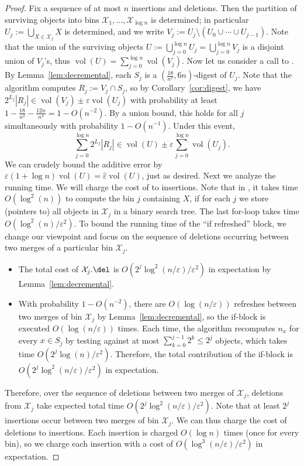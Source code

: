 \documentclass[11pt]{article}
\def\vol{\operatorname{vol}}		%
\newcommand{\eps}{\varepsilon}
\newcommand{\class}[1]{\mathcal{#1}}
\begin{document}
\begin{proof}
    Fix a sequence of at most $n$ insertions and deletions. Then the partition of surviving objects into bins $\class{X}_1, \dots, \class{X}_{\log n}$ is determined; in particular $U_j := \bigcup_{X \in \class{X}_j} X$ is determined, and we write $V_j := U_j \setminus (U_0 \cup \cdots \cup U_{j-1})$. Note that the union of the surviving objects $U := \bigcup_{j=0}^{\log n} U_j = \bigcup_{j=0}^{\log n} V_j$ is a disjoint union of $V_j$'s, thus $\vol(U) = \sum_{j=0}^{\log n} \vol(V_j)$.
%
    Now let us consider a call to \est. By Lemma~\ref{lem:decremental}, each $S_j$ is a $(\frac{18}{n^2}, 6n)$-digest of $U_j$. Note that the algorithm computes $R_j := V_j \cap S_j$, so by Corollary~\ref{cor:digest}, we have $2^{L_j} |R_j| \in \vol(V_j) \pm \eps \vol(U_j)$ with probability at least $1 - \frac{18}{n^2} - \frac{12n}{n^4} = 1 - O(n^{-2})$. By a union bound, this holds for all $j$ simultaneously with probability $1 - O(n^{-1})$. Under this event,
    \[ \sum_{j=0}^{\log n} 2^{L_j}|R_j| \in \vol(U) \pm \eps \sum_{j=0}^{\log n} \vol(U_j). \]
    We can crudely bound the additive error by $\eps (1+\log n)\vol(U) = \hat \eps \vol(U)$, just as desired.
%
    Next we analyze the running time. We will charge the cost of \del to insertions. Note that in \del, it takes time $O(\log^2(n))$ to compute the bin $j$ containing $X$, if for each $j$ we store (pointers to) all objects in $\class{X}_j$ in a binary search tree. The last for-loop takes time $O(\log^2(n) / \eps^2)$. To bound the running time of the ``if refreshed'' block, we change our viewpoint and focus on the sequence of deletions occurring between two merges of a particular bin $\class{X}_j$.
    \begin{itemize}
        \item The total cost of $\class{X}_j.\del$ is $O(2^j \log^2(n/\eps) / \eps^2)$ in expectation by Lemma~\ref{lem:decremental}.  
        \item With probability $1 - O(n^{-2})$, there are $O(\log(n/\eps))$ refreshes between two merges of bin $\class{X}_j$ by Lemma~\ref{lem:decremental}, so the if-block is executed $O(\log(n/\eps))$ times. Each time, the algorithm recomputes $n_x$ for every $x \in S_j$ by testing against at most $\sum_{k = 0}^{j-1} 2^k \leq 2^j$ objects, which takes time $O(2^j \log(n) / \eps^2)$. Therefore, the total contribution of the if-block is $O(2^j \log^2(n/\eps) / \eps^2)$ in expectation.
    \end{itemize}
    Therefore, over the sequence of deletions between two merges of $\class{X}_j$, deletions from $\class{X}_j$ take expected total time $O(2^j \log^2(n/\eps) / \eps^2)$. Note that at least $2^j$ insertions occur between two merges of bin $\class{X}_j$. We can thus charge the cost of deletions to insertions. Each insertion is charged $O(\log n)$ times (once for every bin), so we charge each insertion with a cost of $O(\log^3(n/\eps) / \eps^2)$ in expectation.

\end{proof}
\end{document}
